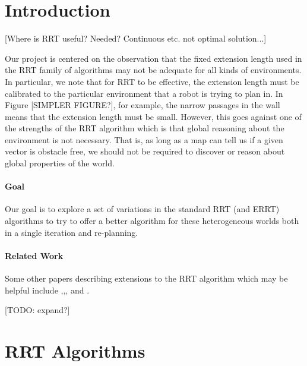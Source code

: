 \documentclass[11pt,twoside,twocolumn]{article}
\begin{document}
\maketitle

\section{Introduction}

[Where is RRT useful? Needed? Continuous etc. not optimal solution...]

Our project is centered on the observation that the fixed extension length used in the RRT\cite{Bruce02real-timerandomized} family of algorithms may not be adequate for all kinds of environments. In particular, we note that for RRT to be effective, the extension length must be calibrated to the particular environment that a robot is trying to plan in. In Figure [SIMPLER FIGURE?], for example, the narrow passages in the wall means that the extension length must be small.  However, this goes against one of the strengths of the RRT algorithm which is that global reasoning about the environment is not necessary. That is, as long as a map can tell us if a given vector is obstacle free, we should not be required to discover or reason about global properties of the world.

\paragraph{Goal}
Our goal is to explore a set of variations in the standard RRT (and ERRT) algorithms to try to offer a better algorithm for these heterogeneous worlds both in a single iteration and re-planning.


\paragraph{Related Work}

Some other papers describing extensions to the RRT algorithm which may be helpful include \cite{Lavalle98rapidly-exploringrandom},\cite{Lindemann04incrementallyreducing},\cite{Jaillet05adaptivetuning}, and \cite{moplan2009}.

[TODO: expand?]

\section{RRT Algorithms}
\end{document}
